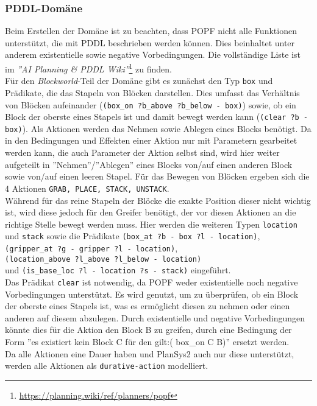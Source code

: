 \subsubsection{PDDL-Domäne}
Beim Erstellen der Domäne ist zu beachten, dass \ac{POPF} nicht alle Funktionen unterstützt, die mit \ac{PDDL} beschrieben werden können.
Dies beinhaltet unter anderem existentielle sowie negative Vorbedingungen.
Die vollständige Liste ist im \emph{''AI Planning \& PDDL Wiki''}\footnote{\url{https://planning.wiki/ref/planners/popf}} zu finden.\\
Für den \emph{Blockworld}-Teil der Domäne gibt es zunächst den Typ \verb|box| und Prädikate, die das Stapeln von Blöcken darstellen.
Dies umfasst das Verhältnis von Blöcken aufeinander (\verb|(box_on ?b_above ?b_below - box)|) sowie, ob ein Block der oberste eines Stapels ist und damit bewegt werden kann (\verb|(clear ?b - box)|).
Als Aktionen werden das Nehmen sowie Ablegen eines Blocks benötigt.
Da in den Bedingungen und Effekten einer Aktion nur mit Parametern gearbeitet werden kann, die auch Parameter der Aktion selbst sind, wird hier weiter aufgeteilt in ''Nehmen''/''Ablegen'' eines Blocks von/auf einen anderen Block sowie von/auf einen leeren Stapel.
Für das Bewegen von Blöcken ergeben sich die 4 Aktionen \verb|GRAB, PLACE, STACK, UNSTACK|.\\
Während für das reine Stapeln der Blöcke die exakte Position dieser nicht wichtig ist, wird diese jedoch für den Greifer benötigt, der vor diesen Aktionen an die richtige Stelle bewegt werden muss.
Hier werden die weiteren Typen \verb|location| und \verb|stack| sowie die Prädikate \verb|(box_at ?b - box ?l - location)|,\\ \verb|(gripper_at ?g - gripper ?l - location)|,\\ \verb|(location_above ?l_above ?l_below - location)|\\und \verb|(is_base_loc ?l - location ?s - stack)| eingeführt.\\
Das Prädikat \verb|clear| ist notwendig, da \ac{POPF} weder existentielle noch negative Vorbedingungen unterstützt.
Es wird genutzt, um zu überprüfen, ob ein Block der oberste eines Stapels ist, was es ermöglicht diesen zu nehmen oder einen anderen auf diesem abzulegen.
Durch existentielle und negative Vorbedingungen könnte dies für die Aktion den Block B zu greifen, durch eine Bedingung der Form ''es existiert kein Block C für den gilt:( box\_on C B)'' ersetzt werden.\\
Da alle Aktionen eine Dauer haben und \ac{PlanSys2} auch nur diese unterstützt, werden alle Aktionen als \verb|durative-action| modelliert.
